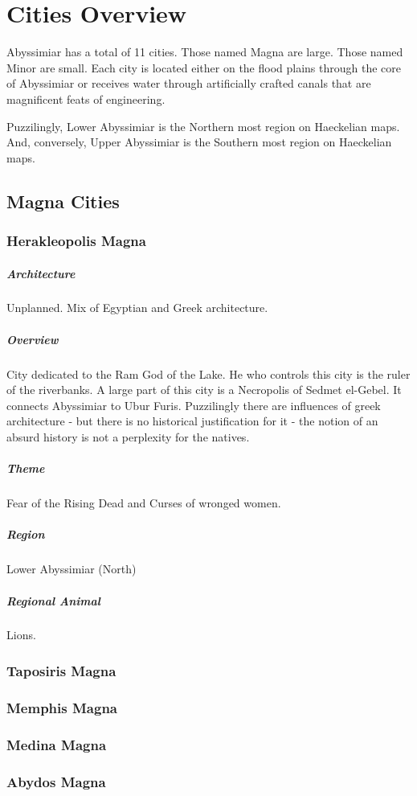 \chapter{Cities Overview}
Abyssimiar has a total of 11 cities. Those named Magna are large. Those named Minor are small. Each city is located either on the flood plains through the core of Abyssimiar or receives water through artificially crafted canals that are magnificent feats of engineering.

Puzzilingly, Lower Abyssimiar is the Northern most region on Haeckelian maps. And, conversely, Upper Abyssimiar is the Southern most region on Haeckelian maps. 

\section{Magna Cities}

\subsection{Herakleopolis Magna}

\paragraph{Architecture} Unplanned. Mix of Egyptian and Greek architecture.

\paragraph{Overview} City dedicated to the Ram God of the Lake. He who controls this city is the ruler of the riverbanks. A large part of this city is a Necropolis of Sedmet el-Gebel. It connects Abyssimiar to Ubur Furis. Puzzilingly there are influences of greek architecture - but there is no historical justification for it - the notion of an absurd history is not a perplexity for the natives.

\paragraph{Theme} Fear of the Rising Dead and Curses of wronged women.

\paragraph{Region} Lower Abyssimiar (North)

\paragraph{Regional Animal} Lions.

\subsection{Taposiris Magna}

\subsection{Memphis Magna}

\subsection{Medina Magna}

\subsection{Abydos Magna}